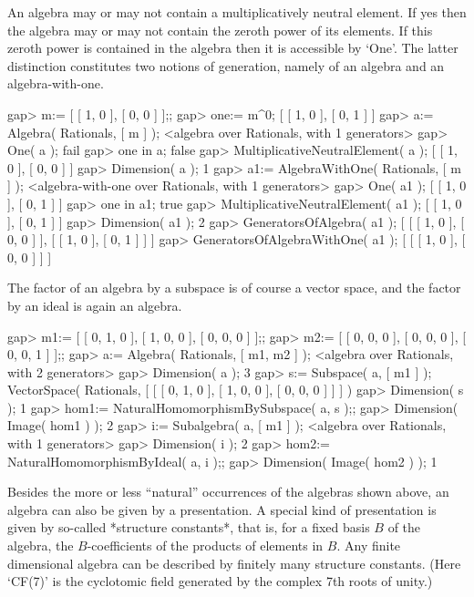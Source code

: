 An algebra may or may not contain a multiplicatively neutral element.
If yes then the algebra may or may not contain the zeroth power
of its elements.
If this zeroth power is contained in the algebra then it is accessible
by `One'.
The latter distinction constitutes two notions of generation,
namely of an algebra and an algebra-with-one.

\beginexample
    gap> m:= [ [ 1, 0 ], [ 0, 0 ] ];;
    gap> one:= m^0;
    [ [ 1, 0 ], [ 0, 1 ] ]
    gap> a:= Algebra( Rationals, [ m ] );
    <algebra over Rationals, with 1 generators>
    gap> One( a );
    fail
    gap> one in a;
    false
    gap> MultiplicativeNeutralElement( a );
    [ [ 1, 0 ], [ 0, 0 ] ]
    gap> Dimension( a );
    1
    gap> a1:= AlgebraWithOne( Rationals, [ m ] );
    <algebra-with-one over Rationals, with 1 generators>
    gap> One( a1 );
    [ [ 1, 0 ], [ 0, 1 ] ]
    gap> one in a1;
    true
    gap> MultiplicativeNeutralElement( a1 );
    [ [ 1, 0 ], [ 0, 1 ] ]
    gap> Dimension( a1 );
    2
    gap> GeneratorsOfAlgebra( a1 );
    [ [ [ 1, 0 ], [ 0, 0 ] ], [ [ 1, 0 ], [ 0, 1 ] ] ]
    gap> GeneratorsOfAlgebraWithOne( a1 );
    [ [ [ 1, 0 ], [ 0, 0 ] ] ]
\endexample

The factor of an algebra by a subspace is of course a vector space,
and the factor by an ideal is again an algebra.

\beginexample
    gap> m1:= [ [ 0, 1, 0 ], [ 1, 0, 0 ], [ 0, 0, 0 ] ];;
    gap> m2:= [ [ 0, 0, 0 ], [ 0, 0, 0 ], [ 0, 0, 1 ] ];;
    gap> a:= Algebra( Rationals, [ m1, m2 ] );
    <algebra over Rationals, with 2 generators>
    gap> Dimension( a );
    3
    gap> s:= Subspace( a, [ m1 ] );
    VectorSpace( Rationals, [ [ [ 0, 1, 0 ], [ 1, 0, 0 ], [ 0, 0, 0 ] ]
     ] )
    gap> Dimension( s );
    1
    gap> hom1:= NaturalHomomorphismBySubspace( a, s );;
    gap> Dimension( Image( hom1 ) );
    2
    gap> i:= Subalgebra( a, [ m1 ] );
    <algebra over Rationals, with 1 generators>
    gap> Dimension( i );
    2
    gap> hom2:= NaturalHomomorphismByIdeal( a, i );;
    gap> Dimension( Image( hom2 ) );
    1
\endexample

Besides the more or less ``natural'' occurrences of the algebras
shown above, an algebra can also be given by a presentation.
A special kind of presentation is given by so-called
*structure constants*, that is, for a fixed basis $B$ of the algebra,
the $B$-coefficients of the products of elements in $B$.
Any finite dimensional algebra can be described by finitely many
structure constants. (Here `CF(7)' is the cyclotomic field
generated by the complex 7th roots of unity.)

